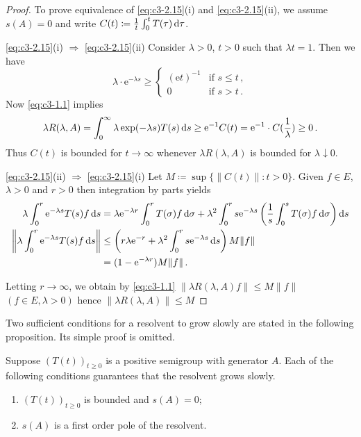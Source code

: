 \begin{proof} 
To prove equivalence of \eqref{eq:c3-2.15}(i) and \eqref{eq:c3-2.15}(ii), we assume $s(A) = 0$ and write $C(t) \coloneqq \frac{1}{t} \int_{0}^{t} T(\tau) \mathop{}\!\mathrm{d}{\tau}$.

\eqref{eq:c3-2.15}(i) $\Rightarrow$ \eqref{eq:c3-2.15}(ii)\quad 
Consider $\lambda > 0$, $t > 0$ such that $\lambda t = 1$. 
Then we have
\[
\lambda \cdot \mathrm{e}^{-\lambda s} \geq 
\begin{cases}
	(\mathrm{e}t)^{-1} & \text{if } s \leq t\,, \\
	0 & \text{if } s > t\,.
\end{cases}
\]
Now \eqref{eq:c3-1.1} implies 
\[
\textit{$\lambda R(\lambda,A) = \int_{0}^{\infty} \lambda \exp(-\lambda s)T(s) \mathop{}\!\mathrm{d}{s} \geq \mathrm{e}^{-1}C(t) = \mathrm{e}^{-1}\cdot C(\frac{1}{\lambda}) \geq 0$}\,.
\]
Thus $C(t)$ is bounded for $t \to \infty$ whenever $\lambda R(\lambda,A)$ is bounded for $\lambda \downarrow 0$.

\eqref{eq:c3-2.15}(ii) $\Rightarrow$ \eqref{eq:c3-2.15}(i)\quad
 Let $M \coloneqq \sup\{\|C(t)\| : t > 0\}$.
Given $f \in E$, $\lambda > 0$ and $r > 0$ then integration by parts yields
\begin{align*}
	\lambda \int_{0}^{r} \mathrm{e}^{-\lambda s}T(s)f \mathop{}\!\mathrm{d}{s} &= \lambda \mathrm{e}^{-\lambda r} \int_{0}^{r} T(\sigma)f \mathop{}\!\mathrm{d}{\sigma} + \lambda^{2}\int_{0}^{r} s\mathrm{e}^{-\lambda s}\left(\frac{1}{s}\int_{0}^{s} T(\sigma)f \mathop{}\!\mathrm{d}{\sigma}\right)\mathop{}\!\mathrm{d}{s} \\
	\left\|\lambda \int_{0}^{r} \mathrm{e}^{-\lambda s}T(s)f \mathop{}\!\mathrm{d}{s}\right\| &\leq \left(r\lambda \mathrm{e}^{-r} + \lambda^{2}\int_{0}^{r} s\mathrm{e}^{-\lambda s} \mathop{}\!\mathrm{d}{s}\right)M\|f\| \\
	&= (1 - \mathrm{e}^{-\lambda r})M\|f\|\,.
\end{align*}

Letting $r \to \infty$, we obtain by \eqref{eq:c3-1.1} $\|\lambda R(\lambda,A)f\| \leq M\|f\|$ $(f \in E, \lambda > 0)$ hence $\|\lambda R(\lambda,A)\| \leq M$
\end{proof}
%
% 
Two sufficient conditions for a resolvent to grow slowly are stated in the following proposition.
Its simple proof is omitted.
\begin{proposition}\label{prop:c3-2.9}
	Suppose $(T(t))_{t\geq 0}$ is a positive semigroup with generator $A$.
	Each of the following conditions guarantees that the resolvent grows slowly.
	\begin{enumerate}[\upshape (i)]
		\item 
		$(T(t))_{t\geq 0}$ is bounded and $s(A) = 0$;
	
		\item 
		$s(A)$ is a first order pole of the resolvent.
	\end{enumerate}
\end{proposition}

